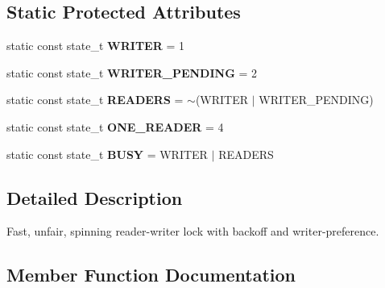 \subsection*{Static Protected Attributes}
\begin{DoxyCompactItemize}
\item 
\hypertarget{classtbb_1_1spin__rw__mutex__v3_aaeec59dde09fe92be196ecddb480777b}{}static const state\+\_\+t {\bfseries W\+R\+I\+T\+E\+R} = 1\label{classtbb_1_1spin__rw__mutex__v3_aaeec59dde09fe92be196ecddb480777b}

\item 
\hypertarget{classtbb_1_1spin__rw__mutex__v3_a5b321914828e5e21baf24d58f32c66d5}{}static const state\+\_\+t {\bfseries W\+R\+I\+T\+E\+R\+\_\+\+P\+E\+N\+D\+I\+N\+G} = 2\label{classtbb_1_1spin__rw__mutex__v3_a5b321914828e5e21baf24d58f32c66d5}

\item 
\hypertarget{classtbb_1_1spin__rw__mutex__v3_a6cc93cdcf4ad43f6bf8b0f76cde66f9e}{}static const state\+\_\+t {\bfseries R\+E\+A\+D\+E\+R\+S} = $\sim$(W\+R\+I\+T\+E\+R $\vert$ W\+R\+I\+T\+E\+R\+\_\+\+P\+E\+N\+D\+I\+N\+G)\label{classtbb_1_1spin__rw__mutex__v3_a6cc93cdcf4ad43f6bf8b0f76cde66f9e}

\item 
\hypertarget{classtbb_1_1spin__rw__mutex__v3_af1386a2fa5979432e4a58b94e68db23f}{}static const state\+\_\+t {\bfseries O\+N\+E\+\_\+\+R\+E\+A\+D\+E\+R} = 4\label{classtbb_1_1spin__rw__mutex__v3_af1386a2fa5979432e4a58b94e68db23f}

\item 
\hypertarget{classtbb_1_1spin__rw__mutex__v3_a6a811c72bd7e5ad6a3a9161ee05e298c}{}static const state\+\_\+t {\bfseries B\+U\+S\+Y} = W\+R\+I\+T\+E\+R $\vert$ R\+E\+A\+D\+E\+R\+S\label{classtbb_1_1spin__rw__mutex__v3_a6a811c72bd7e5ad6a3a9161ee05e298c}

\end{DoxyCompactItemize}


\subsection{Detailed Description}
Fast, unfair, spinning reader-\/writer lock with backoff and writer-\/preference. 



\subsection{Member Function Documentation}
\hypertarget{classtbb_1_1spin__rw__mutex__v3_ab6ec20b1ec43a49c8c2908984e35b5e8}{}
